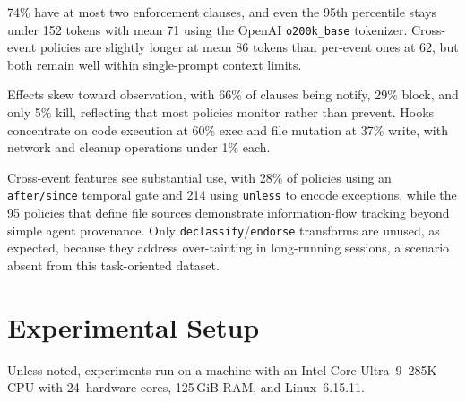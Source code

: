 74\% have at most two enforcement clauses, and even the 95th percentile stays under 152 tokens with mean 71 using the OpenAI \texttt{o200k\_base} tokenizer.
Cross-event policies are slightly longer at mean 86 tokens than per-event ones at 62, but both remain well within single-prompt context limits.

Effects skew toward observation, with 66\% of clauses being notify, 29\% block, and only 5\% kill, reflecting that most policies monitor rather than prevent.
Hooks concentrate on code execution at 60\% exec and file mutation at 37\% write, with network and cleanup operations under 1\% each.

Cross-event features see substantial use, with 28\% of policies using an \texttt{after/since} temporal gate and 214 using \texttt{unless} to encode exceptions, while the 95 policies that define file sources demonstrate information-flow tracking beyond simple agent provenance.
Only \texttt{declassify}/\texttt{endorse} transforms are unused, as expected, because they address over-tainting in long-running sessions, a scenario absent from this task-oriented dataset.

\section{Experimental Setup}
\label{sec:supp:setup}
Unless noted, experiments run on a machine with an Intel Core Ultra~9~285K CPU with 24~hardware cores, 125\,GiB RAM, and Linux~6.15.11.

